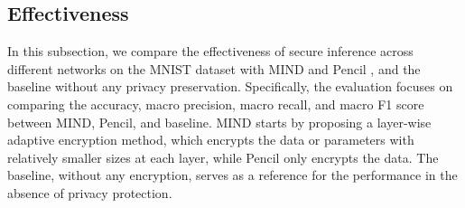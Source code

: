 \documentclass[conference]{IEEEtran}
\begin{document}
\subsection{Effectiveness}
In this subsection, we compare the effectiveness of secure inference across different networks on the MNIST dataset with MIND and Pencil \cite{liu2024pencilprivateextensiblecollaborative}, and the baseline without any privacy preservation.
Specifically, the evaluation focuses on comparing the accuracy, macro precision, macro recall, and macro F1 score between MIND, Pencil, and baseline.
MIND starts by proposing a layer-wise adaptive encryption method, which encrypts the data or parameters with relatively smaller sizes at each layer, while Pencil only encrypts the data. The baseline, without any encryption, serves as a reference for the performance in the absence of privacy protection.














\end{document}
